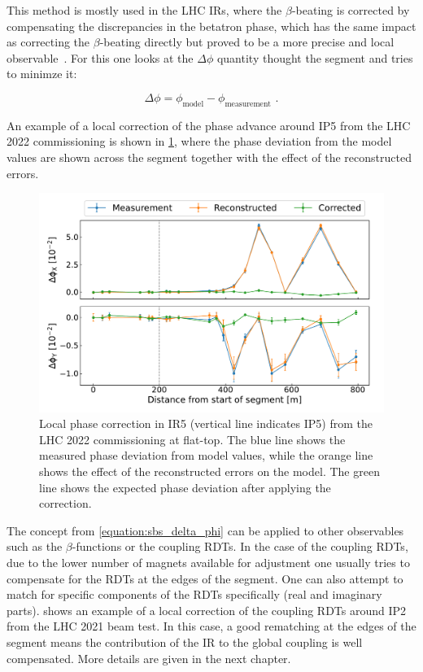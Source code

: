 This method is mostly used in the LHC \glspl{IR}, where the \(\beta\)-beating is corrected by compensating the discrepancies in the betatron phase, which has the same impact as correcting the \(\beta\)-beating directly but proved to be a more precise and local observable~\cite{PRAB:Tomas:CERN_LHC_OMC}.
For this one looks at the \(\Delta \phi\) quantity thought the segment and tries to minimze it:

\begin{equation}
  \Delta \phi = \phi_{\mathrm{model}} - \phi_{\mathrm{measurement}} \text{ .}
  \label{equation:sbs_delta_phi}
\end{equation}

An example of a local correction of the phase advance around IP\num{5} from the LHC \num{2022} commissioning is shown in \cref{figure:example_sbs_correction}, where the phase deviation from the model values are shown across the segment together with the effect of the reconstructed errors.

\begin{figure}[!hbt]
  \centering
  \includegraphics*[width=0.99\linewidth]{Figures/Optics_Measurements_Corrections_at_LHC/sbs_phase_ip5_example.pdf}
  \caption{Local phase correction in IR\num{5} (vertical line indicates IP\num{5}) from the LHC \num{2022} commissioning at flat-top. The \textcolor{mplblue}{blue} line shows the measured phase deviation from model values, while the \textcolor{mplorange}{orange} line shows the effect of the reconstructed errors on the model. The \textcolor{mplgreen}{green} line shows the expected phase deviation after applying the correction.}
  \label{figure:example_sbs_correction}
\end{figure}

The concept from \cref{equation:sbs_delta_phi} can be applied to other observables such as the \(\beta\)-functions or the coupling \glspl{RDT}.
In the case of the coupling RDTs, due to the lower number of magnets available for adjustment one usually tries to compensate for the RDTs at the edges of the segment.
One can also attempt to match for specific components of the RDTs specifically (real and imaginary parts).
 shows an example of a local correction of the coupling RDTs around IP\num{2} from the LHC \num{2021} beam test.
In this case, a good rematching at the edges of the segment means the contribution of the \gls{IR} to the global coupling is well compensated.
More details are given in the next chapter.

